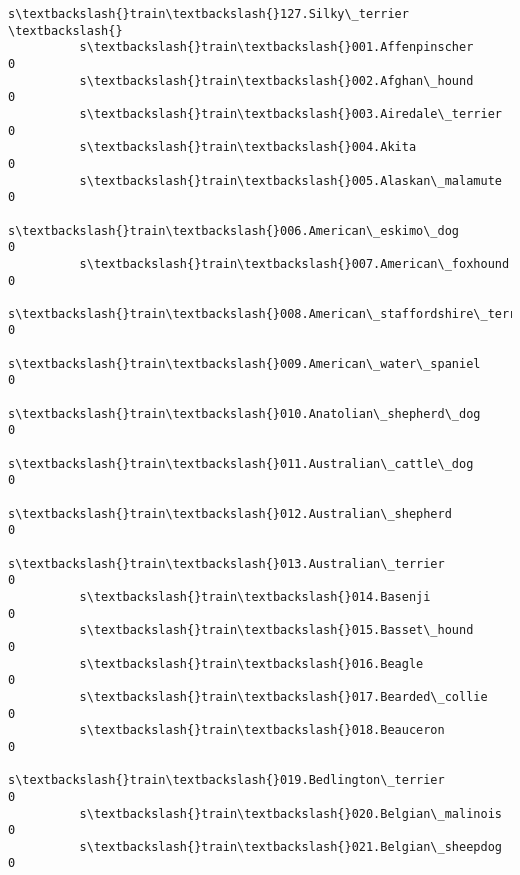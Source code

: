 \documentclass[11pt]{article}
\begin{document}
\begin{Verbatim}[commandchars=\\\{\}]
                                                          s\textbackslash{}train\textbackslash{}127.Silky\_terrier  \textbackslash{}
          s\textbackslash{}train\textbackslash{}001.Affenpinscher                                               0   
          s\textbackslash{}train\textbackslash{}002.Afghan\_hound                                                0   
          s\textbackslash{}train\textbackslash{}003.Airedale\_terrier                                            0   
          s\textbackslash{}train\textbackslash{}004.Akita                                                       0   
          s\textbackslash{}train\textbackslash{}005.Alaskan\_malamute                                            0   
          s\textbackslash{}train\textbackslash{}006.American\_eskimo\_dog                                         0   
          s\textbackslash{}train\textbackslash{}007.American\_foxhound                                           0   
          s\textbackslash{}train\textbackslash{}008.American\_staffordshire\_terrier                              0   
          s\textbackslash{}train\textbackslash{}009.American\_water\_spaniel                                      0   
          s\textbackslash{}train\textbackslash{}010.Anatolian\_shepherd\_dog                                      0   
          s\textbackslash{}train\textbackslash{}011.Australian\_cattle\_dog                                       0   
          s\textbackslash{}train\textbackslash{}012.Australian\_shepherd                                         0   
          s\textbackslash{}train\textbackslash{}013.Australian\_terrier                                          0   
          s\textbackslash{}train\textbackslash{}014.Basenji                                                     0   
          s\textbackslash{}train\textbackslash{}015.Basset\_hound                                                0   
          s\textbackslash{}train\textbackslash{}016.Beagle                                                      0   
          s\textbackslash{}train\textbackslash{}017.Bearded\_collie                                              0   
          s\textbackslash{}train\textbackslash{}018.Beauceron                                                   0   
          s\textbackslash{}train\textbackslash{}019.Bedlington\_terrier                                          0   
          s\textbackslash{}train\textbackslash{}020.Belgian\_malinois                                            0   
          s\textbackslash{}train\textbackslash{}021.Belgian\_sheepdog                                            0   

\end{Verbatim}
\end{document}
